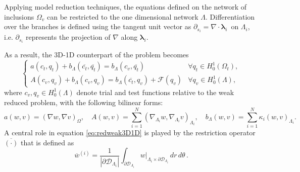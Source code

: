 \documentclass[10pt]{article} %
\def\bct{\overline{c_t}}
\def\bqt{\overline{q_t}}
\begin{document}
	
	Applying model reduction techniques, the equations defined on the network of inclusions $\Omega_v$ can be restricted to the one dimensional network $\Lambda$. Differentiation over the branches is defined using the tangent unit vector as ${\partial_{s_i}} = \nabla \cdot \pmb{\lambda}_i\,$ on $ \Lambda_i$, i.e. ${\partial_{s_i}}$ represents the projection of $\nabla$ along $\boldsymbol \lambda_i$. 
	
	As a result, the 3D-1D counterpart of the problem becomes
	\begin{equation}\label{eq:redweak3D1D}
	\begin{cases}
	a(c_t,q_t) + b_\Lambda(\bct,\bqt) = b_\Lambda(c_v,\bqt) & \forall q_t \in H^1_0(\Omega_t),
	\\
	A(c_v,q_v) + b_\Lambda(c_v,q_v) = b_\Lambda(\bct,q_v) + \mathcal{F} (q_v) & \forall q_v \in H^1_0(\Lambda),
	\end{cases}
	\end{equation}
	where $c_v,q_v \in H^1_0(\Lambda)$ denote trial and test functions relative to the weak reduced problem, with the following bilinear forms:
	\begin{equation*}
	a(w,v) = (\nabla w,\nabla v)_{\Omega}, 
	\quad
	A(w,v) = \sum_{i=1}^N (\nabla_{\Lambda_i} w, \nabla_{\Lambda_i} v)_{\Lambda_i}, 
	\quad 
	b_\Lambda(w,v) = \sum_{i=1}^N \kappa_i (w,v)_{\Lambda_i}.
	\end{equation*}
	A central role in equation \eqref{eq:redweak3D1D} is played by the restriction operator $\overline{(\cdot)}$ that is defined as
	\begin{equation*}
	\overline{w}^{(i)} = 
	\frac{1}{|\partial\mathcal{D}_{\Lambda_i}|} \int_{\partial\mathcal{D}_{\Lambda_i}} w|_{\Lambda_i \times \partial\mathcal{D}_{\Lambda_i}}\,dr\,d\theta\,.
	\end{equation*}
	
\end{document}
